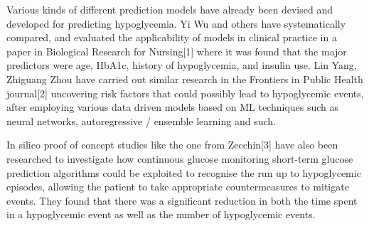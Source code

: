 \begin{flushleft}
Various kinds of different prediction models have already been devised and developed for predicting hypoglycemia. Yi Wu and others have systematically compared, and evaluated the applicability of models in clinical practice in a paper in Biological Research for Nursing[1] 
where it was found that the major predictors were age, HbA1c, history of hypoglycemia, and insulin use. Lin Yang, Zhiguang Zhou have carried out similar research in the Frontiers in Public Health journal[2] uncovering risk factors that could possibly lead to hypoglycemic 
events, after employing various data driven models based on ML techniques such as neural networks, autoregressive / ensemble learning and such. \\ \vspace{5pt}

In silico proof of concept studies like the one from Zecchin[3] have also been researched to investigate how continuous glucose monitoring short-term glucose prediction algorithms could be exploited to recognise the run up to hypoglycemic episodes, allowing the patient to 
take appropriate countermeasures to mitigate events. They found that there was a significant reduction in both the time spent in a hypoglycemic event as well as the number 
of hypoglycemic events. \\ \vspace{5pt}

\end{flushleft}